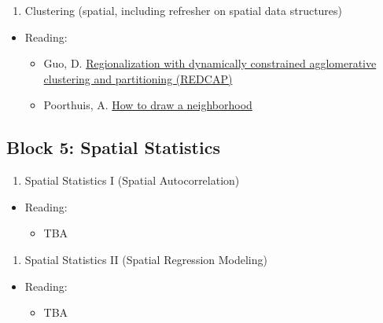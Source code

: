 \documentclass[]{book}
\providecommand{\tightlist}{%
  \setlength{\itemsep}{0pt}\setlength{\parskip}{0pt}}
\begin{document}
\begin{enumerate}
\def\labelenumi{\arabic{enumi}.}
\setcounter{enumi}{8}
\tightlist
\item
  Clustering (spatial, including refresher on spatial data structures)
\end{enumerate}

\begin{itemize}
\tightlist
\item
  Reading:

  \begin{itemize}
  \tightlist
  \item
    Guo, D. \href{https://doi.org/10.1080/13658810701674970}{Regionalization with dynamically constrained agglomerative clustering and partitioning (REDCAP)}
  \item
    Poorthuis, A. \href{https://doi.org/10.1111/gean.12143}{How to draw a neighborhood}
  \end{itemize}
\end{itemize}

\hypertarget{block-5-spatial-statistics}{%
\subsection{Block 5: Spatial Statistics}\label{block-5-spatial-statistics}}

\begin{enumerate}
\def\labelenumi{\arabic{enumi}.}
\setcounter{enumi}{9}
\tightlist
\item
  Spatial Statistics I (Spatial Autocorrelation)
\end{enumerate}

\begin{itemize}
\tightlist
\item
  Reading:

  \begin{itemize}
  \tightlist
  \item
    TBA
  \end{itemize}
\end{itemize}

\begin{enumerate}
\def\labelenumi{\arabic{enumi}.}
\setcounter{enumi}{10}
\tightlist
\item
  Spatial Statistics II (Spatial Regression Modeling)
\end{enumerate}

\begin{itemize}
\tightlist
\item
  Reading:

  \begin{itemize}
  \tightlist
  \item
    TBA
  \end{itemize}
\end{itemize}
\end{document}
